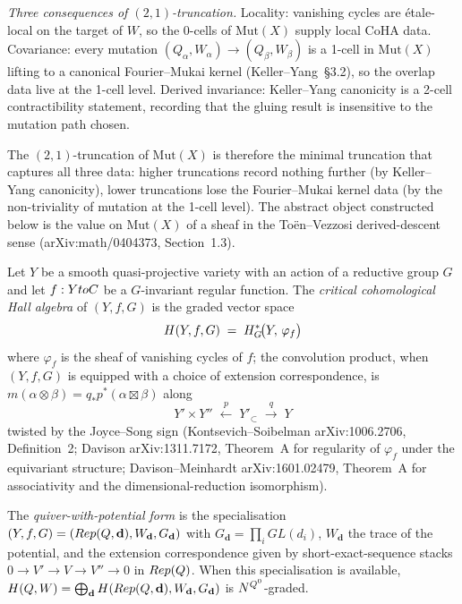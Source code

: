 \emph{Three consequences of $(2,1)$-truncation.} Locality: vanishing
cycles are étale-local on the target of $W$, so the 0-cells of
$\mathrm{Mut}(X)$ supply local CoHA data. Covariance: every
mutation $(Q_\alpha, W_\alpha) \to (Q_\beta, W_\beta)$ is a 1-cell
in $\mathrm{Mut}(X)$ lifting to a canonical Fourier--Mukai kernel
(Keller--Yang~\S3.2), so the overlap data live at the 1-cell level.
Derived invariance: Keller--Yang canonicity is a 2-cell
contractibility statement, recording that the gluing result is
insensitive to the mutation path chosen.

The $(2,1)$-truncation of $\mathrm{Mut}(X)$ is therefore the
minimal truncation that captures all three data: higher truncations
record nothing further (by Keller--Yang canonicity), lower
truncations lose the Fourier--Mukai kernel data (by the
non-triviality of mutation at the 1-cell level). The abstract
object constructed below is the value on $\mathrm{Mut}(X)$ of a
sheaf in the Toën--Vezzosi derived-descent sense
(arXiv:math/0404373, Section~1.3).

\begin{definition}
\label{def:critical-coha-local}
\ClaimStatusDefinition
Let $Y$ be a smooth quasi-projective variety with an action of a
reductive group $G$ and let $f: Y to C$ be a $G$-invariant
regular function. The \emph{critical cohomological Hall algebra}
of $(Y, f, G)$ is the graded vector space
\[
  H(Y, f, G) \;=\; H^{*}_{G}\!\bigl(Y,\, \varphi_f\bigr)
\]
where $\varphi_f$ is the sheaf of vanishing cycles of $f$; the
convolution product, when $(Y, f, G)$ is equipped with a choice of
extension correspondence, is
$m(\alpha \otimes \beta) = q_* p^*(\alpha \boxtimes \beta)$ along
\[
  Y' \times Y''
  \;\xleftarrow{p}\;
  Y'_{\subset}
  \;\xrightarrow{q}\;
  Y
\]
twisted by the Joyce--Song sign
(Kontsevich--Soibelman arXiv:1006.2706, Definition~2; Davison
arXiv:1311.7172, Theorem~A for regularity of $\varphi_f$ under the
equivariant structure; Davison--Meinhardt arXiv:1601.02479,
Theorem~A for associativity and the dimensional-reduction
isomorphism).

The \emph{quiver-with-potential form} is the specialisation
$(Y, f, G) = (Rep(Q, \mathbf d), W_{\mathbf d}, G_{\mathbf d})$
with $G_{\mathbf d} = \prod_i GL(d_i)$, $W_{\mathbf d}$ the trace
of the potential, and the extension correspondence given by
short-exact-sequence stacks $0 \to V' \to V \to V'' \to 0$ in
$Rep(Q)$. When this specialisation is available, $H(Q, W) =
\bigoplus_{\mathbf d} H(Rep(Q, \mathbf d), W_{\mathbf d}, G_{\mathbf d})$
is $N^{Q^0}$-graded.
\end{definition}

